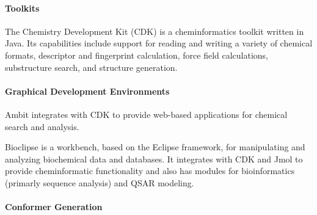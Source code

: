 \paragraph{Toolkits}

The Chemistry Development Kit (CDK) \cite{Steinbeck_2006} is a cheminformatics toolkit written in Java.  Its capabilities include support for reading and writing a variety of chemical formats, descriptor and fingerprint calculation, force field calculations, substructure search, and structure generation.

\paragraph{Graphical Development Environments}

Ambit \cite{Jeliazkova_2011} integrates with CDK to provide web-based applications for chemical search and analysis.

Bioclipse is a workbench, based on the Eclipse framework, for manipulating and analyzing biochemical data and databases. It integrates with CDK and Jmol to provide cheminformatic functionality and also has modules for bioinformatics (primarly sequence analysis) and QSAR modeling.

\paragraph{Conformer Generation}